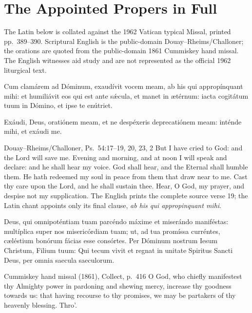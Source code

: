 \section*{The Appointed Propers in Full}

\noindent The Latin below is collated against the 1962 Vatican typical Missal,
printed pp.~389--390. Scriptural English is the public-domain
Douay--Rheims/Challoner; the orations are quoted from the public-domain 1861
Cummiskey hand missal. The English witnesses aid study and are not represented
as the official 1962 liturgical text.

Cum clamárem ad Dóminum, exaudívit vocem meam, ab his qui appropínquant mihi:
et humiliávit eos qui est ante s\'{\ae}cula, et manet in ætérnum: iacta cogitátum
tuum in Dómino, et ipse te enútriet.

\medskip\noindent{} Exáudi, Deus, oratiónem meam, et ne despéxeris
deprecatiónem meam: inténde mihi, et exáudi me.
\finishfulltextelement
\begin{fulltextenglish}{Douay--Rheims/Challoner, Ps.~54:17--19, 20, 23, 2}
But I have cried to God: and the Lord will save me. Evening and morning, and
at noon I will speak and declare: and he shall hear my voice. God shall hear,
and the Eternal shall humble them. He hath redeemed my soul in peace from
them that draw near to me. Cast thy care upon the Lord, and he shall sustain
thee. Hear, O God, my prayer, and despise not my supplication. The English
prints the complete source verse 19; the Latin chant appoints only its final
clause, \emph{ab his qui appropinquant mihi}.
\end{fulltextenglish}

Deus, qui omnipoténtiam tuam parcéndo máxime et miserándo maniféstas:
multíplica super nos misericórdiam tuam; ut, ad tua promíssa curréntes,
cæléstium bonórum fácias esse consórtes. Per Dóminum nostrum Iesum Christum,
Filium tuum: Qui tecum vivit et regnat in unitate Spiritus Sancti Deus, per
omnia saecula saeculorum.
\finishfulltextelement
\begin{fulltextenglish}{Cummiskey hand missal (1861), Collect, p.~416}
O God, who chiefly manifestest thy Almighty power in pardoning and shewing
mercy, increase thy goodness towards us: that having recourse to thy promises,
we may be partakers of thy heavenly blessing. Thro'.
\end{fulltextenglish}

